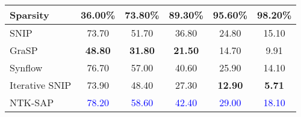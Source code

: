 \begin{table*}[h!]
\begin{center}
{\begin{tabular}{l ccccc}
    \bottomrule
    \end{tabular}
    }
    
    \end{center}
        \begin{center}
    \caption{Total pruning + training FLOPs ($\times 10^{14}$) comparison on Tiny-ImageNet(ResNet-18). Results with the largest FLOPs are in \textcolor{blue}{blue} and results with the smallest FLOPs are in \textbf{bold}.}     \label{tab:appendix-flops-total-tiny}
    {
    \begin{tabular}{l ccccc}
    \\
    \hline
    \toprule
    Sparsity & 36.00\% & 73.80\% & 89.30\% & 95.60\% & 98.20\% \\
    \midrule
    SNIP & 73.70 & 51.70 & 36.80 & 24.80 & 15.10  \\
    GraSP & \textbf{48.80} & \textbf{31.80} & \textbf{21.50} & 14.70 & 9.91 \\
    Synflow & 76.70 & 57.00 & 40.60 & 25.90 & 14.10 \\
    Iterative SNIP & 73.90 & 48.40 & 27.30 & \textbf{12.90} & \textbf{5.71}\\
    NTK-SAP & \textcolor{blue}{78.20} & \textcolor{blue}{58.60} & \textcolor{blue}{42.40} & \textcolor{blue}{29.00} & \textcolor{blue}{18.10} \\

    \bottomrule
    \end{tabular}
    }
    
    \end{center}
\end{table*}